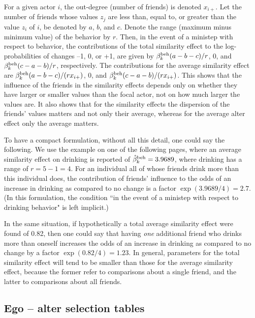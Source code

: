 \documentclass[a4paper,fleqn,11pt]{article}
\newcommand{\+}{\, + \,}
\begin{document}
For a given actor $i$, the out-degree (number of friends) is denoted $x_{i+}$.
Let the number of friends whose values $z_j$ are less than, equal to,
or greater than the value $z_i $ of $i$, be denoted by $a$, $b$, and $c$.
Denote the range (maximum minus minimum value) of the behavior by $r$.
Then, in the event of a ministep with respect to behavior,
the contributions of the total similarity effect to the log-probabilities
of changes --1, 0, or +1, are given by $\beta^{\rm beh}_k(a-b-c)/r$,
0, and $\beta^{\rm beh}_k(c-a-b)/r$, respectively.
The contributions for the average similarity effect are
$\beta^{\rm beh}_k(a-b-c)/(rx_{i+})$,
0, and $\beta^{\rm beh}_k(c-a-b)/(rx_{i+})$.
This shows that the influence of the friends in the similarity effects
depends only on whether they have larger or smaller values than the focal actor,
not on how much larger the values are.
It also shows that for the similarity effects the dispersion of the
friends' values matters and not only their average,
whereas for the average alter effect only the average matters.

To have a compact formulation, without all this detail, one could
say the following. We use the example on one of the following
pages, where an average similarity effect on drinking is reported of
$\hat\beta^{\rm beh}_k = 3.9689$, where drinking has a range of $r = 5-1 = 4$.
For an individual all of whose friends drink more than this individual does,
the contribution of friends' influence to the odds of an increase in drinking
as compared to no change is a factor $\exp(3.9689/4) = 2.7$.
(In this formulation, the condition ``in the event of a ministep
with respect to drinking behavior" is left implicit.)

In the same situation, if hypothetically a total average similarity
effect were found of 0.82, then one could say that having \emph{one} additional
friend who drinks more than oneself increases the odds of an increase in drinking
as compared to no change by a factor $\exp(0.82/4) = 1.23$.
In general, parameters for the total similarity effect will tend to be
smaller than those for the average similarity effect, because the former
refer to comparisons about a single friend, and the latter to comparisons
about all friends.

\subsection{Ego -- alter selection tables}
\end{document}
